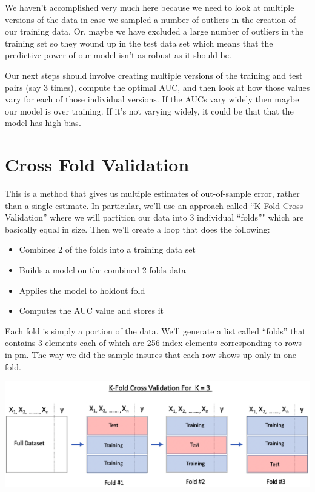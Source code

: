 \documentclass[
]{book}
\providecommand{\tightlist}{%
  \setlength{\itemsep}{0pt}\setlength{\parskip}{0pt}}
\begin{document}
We haven't accomplished very much here because we need to look at multiple versions of the data in case we sampled a number of outliers in the creation of our training data. Or, maybe we have excluded a large number of outliers in the training set so they wound up in the test data set which means that the predictive power of our model isn't as robust as it should be.

Our next steps should involve creating multiple versions of the training and test pairs (say 3 times), compute the optimal AUC, and then look at how those values vary for each of those individual versions. If the AUCs vary widely then maybe our model is over training. If it's not varying widely, it could be that that the model has high bias.

\hypertarget{cross-fold-validation}{%
\section{Cross Fold Validation}\label{cross-fold-validation}}

This is a method that gives us multiple estimates of out-of-sample error, rather than a single estimate. In particular, we'll use an approach called ``K-Fold Cross Validation'' where we will partition our data into 3 individual ``folds''" which are basically equal in size. Then we'll create a loop that does the following:

\begin{itemize}
\tightlist
\item
  Combines 2 of the folds into a training data set
\item
  Builds a model on the combined 2-folds data
\item
  Applies the model to holdout fold
\item
  Computes the AUC value and stores it
\end{itemize}

Each fold is simply a portion of the data. We'll generate a list called ``folds'' that contains 3 elements each of which are 256 index elements corresponding to rows in pm. The way we did the sample insures that each row shows up only in one fold.

\includegraphics{./PICS/kf3.png}
\end{document}
